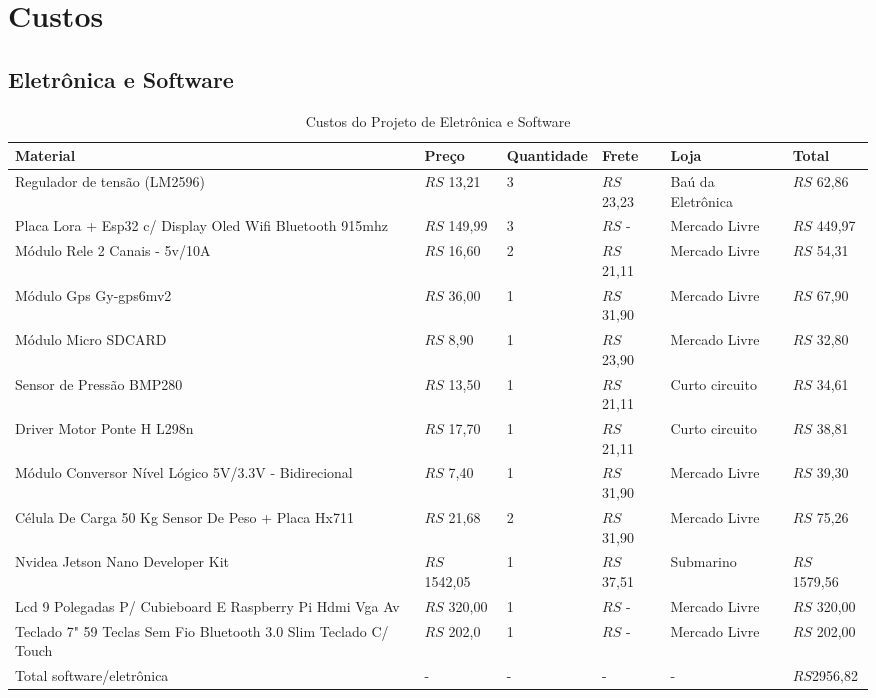 \chapter{Custos}

\section{Eletrônica e Software}

\begin{table}[h!]
\centering
\begin{tabular}{| m{4cm}|m{2cm}|m{2cm}|m{2cm}|m{2cm}|m{2cm}|}
\hline 
Material & Preço  & Quantidade & Frete & Loja & Total  \\\hline
Regulador de tensão (LM2596) & $RS$ 13,21 & 3 & $RS$ 23,23 & Baú da Eletrônica & $RS$ 62,86 \\\hline
Placa Lora + Esp32 c/ Display Oled Wifi Bluetooth 915mhz& $RS$ 149,99 & 3 & $RS$ -  & Mercado Livre & $RS$ 449,97 \\\hline
Módulo Rele 2 Canais - 5v/10A & $RS$ 16,60 & 2 & $RS$ 21,11 & Mercado Livre & $RS$ 54,31 \\\hline
Módulo Gps Gy-gps6mv2 & $RS$ 36,00 & 1 & $RS$ 31,90 & Mercado Livre & $RS$ 67,90 \\\hline
Módulo Micro SDCARD & $RS$ 8,90 & 1 & $RS$ 23,90 & Mercado Livre & $RS$ 32,80 \\\hline
Sensor de Pressão BMP280 & $RS$ 13,50 & 1 & $RS$ 21,11 & Curto circuito & $RS$ 34,61 \\\hline
Driver Motor Ponte H L298n & $RS$ 17,70 & 1 & $RS$ 21,11 & Curto circuito & $RS$ 38,81 \\\hline
Módulo Conversor Nível Lógico 5V/3.3V - Bidirecional  & $RS$ 7,40 & 1 & $RS$ 31,90 & Mercado Livre  & $RS$ 39,30 \\\hline
Célula De Carga 50 Kg Sensor De Peso + Placa Hx711  & $RS$ 21,68 & 2 & $RS$ 31,90 & Mercado Livre  & $RS$ 75,26\\\hline
Nvidea Jetson Nano Developer Kit & $RS$ 1542,05 & 1 & $RS$ 37,51 & Submarino  & $RS$ 1579,56\\\hline
Lcd 9 Polegadas P/ Cubieboard E Raspberry Pi Hdmi Vga Av & $RS$ 320,00 & 1 & $RS$ - & Mercado Livre  & $RS$ 320,00\\\hline
Teclado 7" 59 Teclas Sem Fio Bluetooth 3.0 Slim Teclado C/ Touch & $RS$ 202,0 & 1 & $RS$ - & Mercado Livre  & $RS$ 202,00\\\hline
Total software/eletrônica & - & - & - & - & $RS$2956,82  \\\hline
\end{tabular}
\caption{Custos do Projeto de Eletrônica e Software}
\label{tab:custos_eletro_soft}
\end{table}

